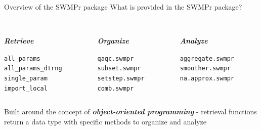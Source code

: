 \documentclass[xcolor=svgnames]{beamer}\usepackage[]{graphicx}\usepackage[]{color}
\makeatletter
\newcommand{\hlstd}[1]{\textcolor[rgb]{0.345,0.345,0.345}{#1}}%
\newenvironment{kframe}{%
 \def\at@end@of@kframe{}%
 \ifinner\ifhmode%
  \def\at@end@of@kframe{\end{minipage}}%
  \begin{minipage}{\columnwidth}%
 \fi\fi%
 \def\FrameCommand##1{\hskip\@totalleftmargin \hskip-\fboxsep
 \colorbox{shadecolor}{##1}\hskip-\fboxsep
     \hskip-\linewidth \hskip-\@totalleftmargin \hskip\columnwidth}%
 \MakeFramed {\advance\hsize-\width
   \@totalleftmargin\z@ \linewidth\hsize
   \@setminipage}}%
 {\par\unskip\endMakeFramed%
 \at@end@of@kframe}
\newenvironment{knitrout}{}{} %
\newcommand{\Bigtxt}[1]{\textbf{\textit{#1}}}
\makeatother
\begin{document}
\begin{frame}[fragile]{Overview of the SWMPr package}
What is provided in the SWMPr package? \\~\\
\begin{columns}[t]
\begin{column}{0.3\textwidth}
\Bigtxt{Retrieve}
\begin{knitrout}
\color{fgcolor}\begin{kframe}
\begin{alltt}
\hlstd{all_params}
\hlstd{all_params_dtrng}
\hlstd{single_param}
\hlstd{import_local}
\end{alltt}
\end{kframe}
\end{knitrout}
\end{column}
\begin{column}{0.3\textwidth}
\Bigtxt{Organize}
\begin{knitrout}
\color{fgcolor}\begin{kframe}
\begin{alltt}
\hlstd{qaqc.swmpr}
\hlstd{subset.swmpr}
\hlstd{setstep.swmpr}
\hlstd{comb.swmpr}
\end{alltt}
\end{kframe}
\end{knitrout}
\end{column}
\begin{column}{0.3\textwidth}
\Bigtxt{Analyze}
\begin{knitrout}
\color{fgcolor}\begin{kframe}
\begin{alltt}
\hlstd{aggregate.swmpr}
\hlstd{smoother.swmpr}
\hlstd{na.approx.swmpr}
\end{alltt}
\end{kframe}
\end{knitrout}
\end{column}
\end{columns}
\vspace{0.15in}
Built around the concept of \Bigtxt{object-oriented programming} - retrieval functions return a data type with specific methods to organize and analyze
\end{frame}
\end{document}
